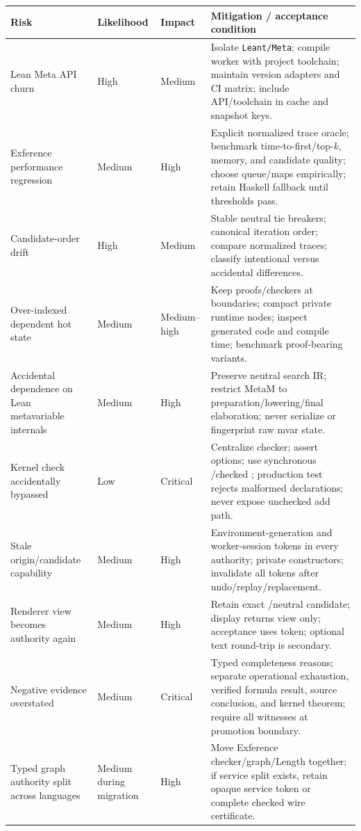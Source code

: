 \documentclass[10pt,letterpaper,oneside]{report}
\newcommand{\code}[1]{\texttt{\detokenize{#1}}}
\newcommand{\filepath}[1]{\nolinkurl{#1}}
\begin{document}
\begin{longtable}{@{}L{0.21\textwidth}C{0.09\textwidth}C{0.09\textwidth}L{0.51\textwidth}@{}}
\toprule
\textbf{Risk} & \textbf{Likeli\-hood} & \textbf{Impact} & \textbf{Mitigation / acceptance condition} \\
\midrule
\endhead
Lean Meta API churn & High & Medium & Isolate \filepath{Leant/Meta}; compile worker with project toolchain; maintain version adapters and CI matrix; include API/toolchain in cache and snapshot keys. \\
Exference performance regression & Medium & High & Explicit normalized trace oracle; benchmark time-to-first/top-\(k\), memory, and candidate quality; choose queue/maps empirically; retain Haskell fallback until thresholds pass. \\
Candidate-order drift & High & Medium & Stable neutral tie breakers; canonical iteration order; compare normalized traces; classify intentional versus accidental differences. \\
Over-indexed dependent hot state & Medium & Medium--high & Keep proofs/checkers at boundaries; compact private runtime nodes; inspect generated code and compile time; benchmark proof-bearing variants. \\
Accidental dependence on Lean metavariable internals & Medium & High & Preserve neutral search IR; restrict MetaM to preparation/lowering/final elaboration; never serialize or fingerprint raw mvar state. \\
Kernel check accidentally bypassed & Low & Critical & Centralize checker; assert options; use synchronous \code{Kernel.Environment.addDecl}/checked \code{addDecl}; production test rejects malformed declarations; never expose unchecked add path. \\
Stale origin/candidate capability & Medium & High & Environment-generation and worker-session tokens in every authority; private constructors; invalidate all tokens after undo/replay/replacement. \\
Renderer view becomes authority again & Medium & High & Retain exact \code{Expr}/neutral candidate; display returns view only; acceptance uses token; optional text round-trip is secondary. \\
Negative evidence overstated & Medium & Critical & Typed completeness reasons; separate operational exhaustion, verified formula result, source conclusion, and kernel theorem; require all witnesses at promotion boundary. \\
Typed graph authority split across languages & Medium during migration & High & Move Exference checker/graph/Length together; if service split exists, retain opaque service token or complete checked wire certificate. \\

\end{longtable}
\end{document}

